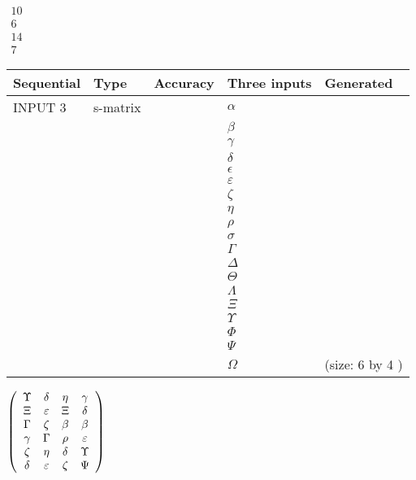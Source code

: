\documentclass[12pt]{article}
\begin{document}
   
 $\begin{array}{
 c
 }
 10  \\ 
 6  \\ 
 14  \\ 
 7
\end{array}  $ 
  
  
\noindent\begin{tabular}{|l|l|l|l|l|}
\hline
 Sequential & Type & Accuracy & Three inputs & Generated \\ 
\hline
 
 
  INPUT $  3 $ & s-matrix & & 
 $  \alpha $ & 
  \\
  & & & 
 $  \beta $ & 
  \\
  & & & 
 $  \gamma $ & 
  \\
  & & & 
 $  \delta $ & 
  \\
  & & & 
 $  \epsilon $ & 
  \\
  & & & 
 $  \varepsilon $ & 
  \\
  & & & 
 $                     \zeta $ & 
  \\
  & & & 
 $  \eta $ & 
  \\
  & & & 
 $  \rho $ & 
  \\
  & & & 
 $  \sigma $ & 
  \\
  & & & 
 $  \Gamma $ & 
  \\
  & & & 
 $  \Delta $ & 
  \\
  & & & 
 $  \Theta $ & 
  \\
  & & & 
 $  \Lambda $ & 
  \\
  & & & 
 $                     \Xi $ & 
  \\
  & & & 
 $  \Upsilon $ & 
  \\
  & & & 
 $  \Phi $ & 
  \\
  & & & 
 $  \Psi $ & 
  \\
  & & & 
 $  \Omega $ & 
  (size:  6  by  4 )
 \\  \hline  
 \end{tabular}
   
   
 $  \left( \begin{array}
 {
 c
 c
 c
 c
 }
 \Upsilon & 
 \delta & 
 \eta & 
 \gamma \\ 
                    \Xi & 
 \varepsilon & 
                    \Xi & 
 \delta \\ 
 \Gamma & 
                    \zeta & 
 \beta & 
 \beta \\ 
 \gamma & 
 \Gamma & 
 \rho & 
 \varepsilon \\ 
                    \zeta & 
 \eta & 
 \delta & 
 \Upsilon \\ 
 \delta & 
 \varepsilon & 
                    \zeta & 
 \Psi
 \end{array} \right) $ 
  
\end{document}
